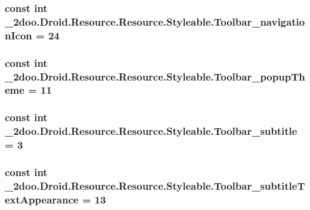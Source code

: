 \hypertarget{class__2doo_1_1_droid_1_1_resource_1_1_styleable_8d96bf9141298f4c3ca6fbcc47a5d07e}{
\subsubsection[{Toolbar\_\-navigationIcon}]{\setlength{\rightskip}{0pt plus 5cm}const int \_\-2doo.Droid.Resource.Resource.Styleable.Toolbar\_\-navigationIcon = 24}}
\label{class__2doo_1_1_droid_1_1_resource_1_1_styleable_8d96bf9141298f4c3ca6fbcc47a5d07e}


\hypertarget{class__2doo_1_1_droid_1_1_resource_1_1_styleable_a4ae0c2c3a7606fad7c8629fb6545ade}{
\subsubsection[{Toolbar\_\-popupTheme}]{\setlength{\rightskip}{0pt plus 5cm}const int \_\-2doo.Droid.Resource.Resource.Styleable.Toolbar\_\-popupTheme = 11}}
\label{class__2doo_1_1_droid_1_1_resource_1_1_styleable_a4ae0c2c3a7606fad7c8629fb6545ade}


\hypertarget{class__2doo_1_1_droid_1_1_resource_1_1_styleable_8364fbf733334e933445db1a02f69c34}{
\subsubsection[{Toolbar\_\-subtitle}]{\setlength{\rightskip}{0pt plus 5cm}const int \_\-2doo.Droid.Resource.Resource.Styleable.Toolbar\_\-subtitle = 3}}
\label{class__2doo_1_1_droid_1_1_resource_1_1_styleable_8364fbf733334e933445db1a02f69c34}


\hypertarget{class__2doo_1_1_droid_1_1_resource_1_1_styleable_4d03245b08b37aa951d35a8764c4cb7f}{
\subsubsection[{Toolbar\_\-subtitleTextAppearance}]{\setlength{\rightskip}{0pt plus 5cm}const int \_\-2doo.Droid.Resource.Resource.Styleable.Toolbar\_\-subtitleTextAppearance = 13}}
\label{class__2doo_1_1_droid_1_1_resource_1_1_styleable_4d03245b08b37aa951d35a8764c4cb7f}


